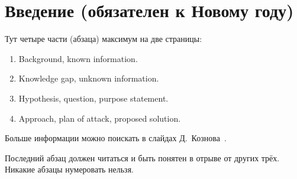 
\section*{Введение (обязателен к Новому году)}
\thispagestyle{withCompileDate}

Тут четыре части (абзаца) максимум на две страницы:
\begin{enumerate}
\item Background, known information.
\item Knowledge gap, unknown information.
\item  Hypothesis, question, purpose statement.
\item Approach, plan of attack, proposed solution.
\end{enumerate}
Больше информации можно поискать в слайдах Д.~Кознова~\cite{koznov}.


Последний абзац должен читаться и быть понятен в отрыве от других трёх. Никакие абзацы нумеровать нельзя.




